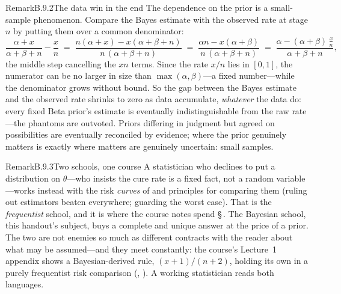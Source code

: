 \documentclass[main.tex]{subfiles}
\begin{document}
\begin{ObjL}{Remark}{B.9.2}{The data win in the end}
The dependence on the prior is a small-sample phenomenon. Compare the Bayes estimate with
the observed rate at stage $n$ by putting them over a common denominator:
\[ \frac{\alpha+x}{\alpha+\beta+n} - \frac{x}{n}
   \;=\; \frac{n(\alpha+x) - x(\alpha+\beta+n)}{n\,(\alpha+\beta+n)}
   \;=\; \frac{\alpha n - x(\alpha+\beta)}{n\,(\alpha+\beta+n)}
   \;=\; \frac{\alpha - (\alpha+\beta)\,\frac{x}{n}}{\alpha+\beta+n} , \]
the middle step cancelling the $xn$ terms. Since the rate $x/n$ lies in $[0,1]$, the
numerator can be no larger in size than $\max(\alpha,\beta)$---a fixed number---while the
denominator grows without bound. So the gap between the Bayes estimate and the observed
rate shrinks to zero as data accumulate, \emph{whatever} the data do: every fixed Beta
prior's estimate is eventually indistinguishable from the raw rate---the phantoms are
outvoted. Priors differing in judgment but agreed on possibilities are eventually
reconciled by evidence; where the prior genuinely matters is exactly where matters are
genuinely uncertain: small samples.
\end{ObjL}

\begin{ObjL}{Remark}{B.9.3}{Two schools, one course}
A statistician who declines to put a distribution on $\theta$---who insists the cure rate
is a fixed fact, not a random variable---works instead with the risk \emph{curves} of
 and principles for comparing them (ruling out estimators beaten everywhere;
guarding the worst case). That is the \emph{frequentist} school, and it is where the course
notes spend \S\,. The Bayesian school, this handout's subject, buys a complete
and unique answer at the price of a prior. The two are not enemies so much as different
contracts with the reader about what may be assumed---and they meet constantly: the
course's Lecture~1 appendix shows a Bayesian-derived rule, $(x+1)/(n+2)$, holding its own
in a purely frequentist risk comparison (, ). A working
statistician reads both languages.
\end{ObjL}

\end{document}
